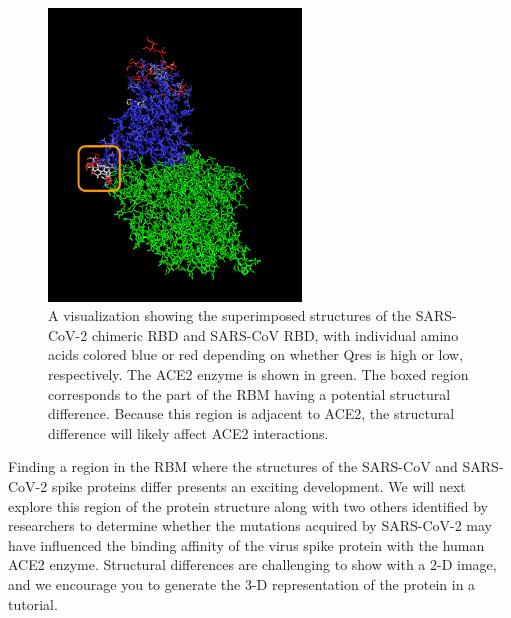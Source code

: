 \begin{figure}[h]
	\centering
	\mySfFamily
	\includegraphics[width = 0.6\textwidth]{../images/QresVMD.png}
	\caption{A visualization showing the superimposed structures of the SARS-CoV-2 chimeric RBD  and SARS-CoV RBD, with individual amino acids colored blue or red depending on whether Qres is high or low, respectively.  The ACE2 enzyme is shown in green. The boxed region corresponds to the part of the RBM having a potential structural difference. Because this region is adjacent to ACE2, the structural difference will likely affect ACE2 interactions.}
	\label{fig:QresVMD}
\end{figure}

\begin{note}\end{note}

Finding a region in the RBM where the structures of the SARS-CoV and SARS-CoV-2 spike proteins differ presents an exciting development. We will next explore this region of the protein structure along with two others identified by researchers to determine whether the mutations acquired by SARS-CoV-2 may have influenced the binding affinity of the virus spike protein with the human ACE2 enzyme. Structural differences are challenging to show with a 2-D image, and we encourage you to generate the 3-D representation of the protein in a tutorial.\\

